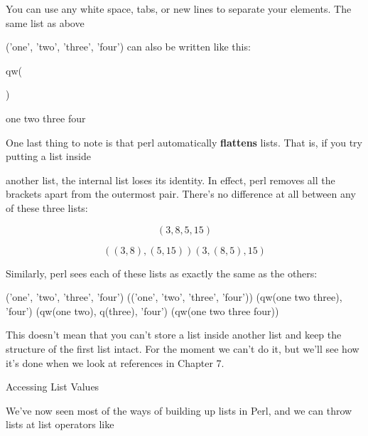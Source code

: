 \documentclass[a4paper,11pt]{book}
\begin{document}
\noindent 

\noindent You can use any white space, tabs, or new lines to separate your elements. The same list as above

\noindent ('one', 'two', 'three', 'four') can also be written like this:

\noindent 

\noindent 

\noindent qw(

\noindent 

\noindent 

\noindent 

\noindent 

\noindent )

\noindent 

\noindent one two three four

\noindent 

\noindent One last thing to note is that perl automatically \textbf{flattens }lists. That is, if you try putting a list inside

\noindent another list, the internal list loses its identity. In effect, perl removes all the brackets apart from the outermost pair. There's no difference at all between any of these three lists:

\noindent 

\[(3, 8, 5, 15)\] 

\[((3, 8), (5, 15)) (3, (8, 5), 15)\] 


\noindent 

\noindent Similarly, perl sees each of these lists as exactly the same as the others:

\noindent 

\noindent 

\noindent ('one', 'two', 'three', 'four') (('one', 'two', 'three', 'four')) (qw(one two three), 'four') (qw(one two), q(three), 'four') (qw(one two three four))

\noindent 

\noindent This  doesn't mean that  you  can't  store  a  list  inside  another  list  and  keep  the structure  of  the  first list intact.  For the moment we can't  do  it,  but  we'll see  how  it's  done  when  we  look at  references in Chapter 7.

\noindent 

\noindent Accessing List Values

\noindent 

\noindent We've now seen most of the ways of building up lists in Perl, and we can throw lists at list operators like
\end{document}
